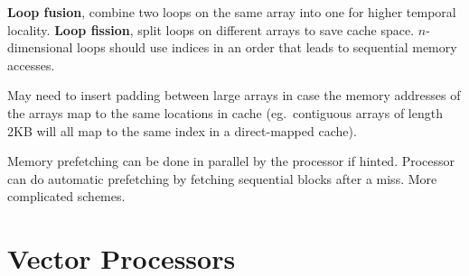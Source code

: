 \documentclass[a4paper,11pt]{article}
\begin{document}
{{        \textbf{Loop fusion}, combine two loops on the same array into one for higher temporal locality. \textbf{Loop fission}, split loops on different arrays to save cache space. \(n\)-dimensional loops should use indices in an order that leads to sequential memory accesses.

        May need to insert padding between large arrays in case the memory addresses of the arrays map to the same locations in cache (eg.\ contiguous arrays of length 2KB will all map to the same index in a direct-mapped cache).

        Memory prefetching can be done in parallel by the processor if hinted. Processor can do automatic prefetching by fetching sequential blocks after a miss. More complicated schemes.
    }
}
\section*{Vector Processors}
\end{document}
